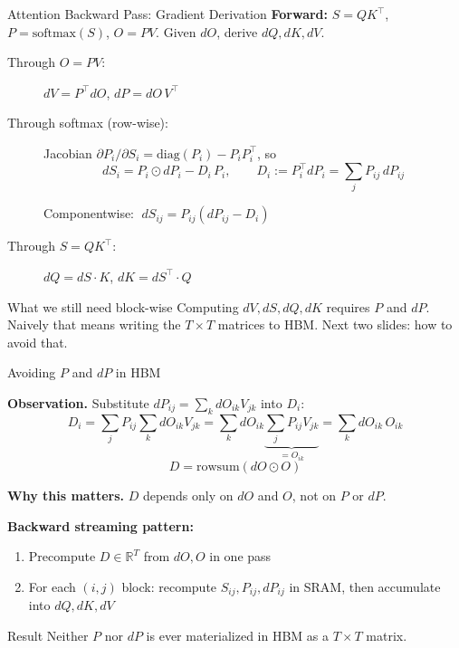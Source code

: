 \begin{frame}{Attention Backward Pass: Gradient Derivation}
  \textbf{Forward:} $S = QK^\top$, \; $P = \text{softmax}(S)$, \; $O = PV$. \;
  Given $dO$, derive $dQ, dK, dV$.

  \vspace{0.6em}
  \begin{description}
    \item[Through $O = PV$:] \quad $dV = P^\top dO$, \quad $dP = dO\, V^\top$
    \item[Through softmax (row-wise):] Jacobian $\partial P_i/\partial S_i = \text{diag}(P_i) - P_i P_i^\top$, so
      \vspace{-0.3em}
      \[
        dS_i = P_i \odot dP_i - D_i\, P_i,
        \qquad D_i := P_i^\top dP_i = \sum_j P_{ij}\, dP_{ij}
      \]
      \vspace{-1.0em}
      \begin{center}
        Componentwise: $\; dS_{ij} = P_{ij}(dP_{ij} - D_i)$
      \end{center}
    \item[Through $S = QK^\top$:] \quad $dQ = dS \cdot K$, \quad $dK = dS^\top \cdot Q$
  \end{description}

  \vspace{0.6em}
  \begin{alertblock}{What we still need block-wise}
    Computing $dV, dS, dQ, dK$ requires $P$ and $dP$. Naively that means writing the $T \times T$ matrices to HBM. Next two slides: how to avoid that.
  \end{alertblock}
\end{frame}

\begin{frame}{Avoiding $P$ and $dP$ in HBM}

  \textbf{Observation.} Substitute $dP_{ij} = \sum_k dO_{ik} V_{jk}$ into $D_i$:
  \vspace{-0.3em}
  \[
    D_i = \sum_j P_{ij} \sum_k dO_{ik} V_{jk}
        = \sum_k dO_{ik} \underbrace{\sum_j P_{ij} V_{jk}}_{= O_{ik}}
        = \sum_k dO_{ik}\, O_{ik}
  \]
  \vspace{-0.3em}
  \[
    \boxed{\; D = \text{rowsum}(dO \odot O) \;}
  \]

  \vspace{0.4em}
  \textbf{Why this matters.} $D$ depends only on $dO$ and $O$, not on $P$ or $dP$.

  \vspace{0.4em}
  \textbf{Backward streaming pattern:}
  \begin{enumerate}
    \item Precompute $D \in \mathbb{R}^{T}$ from $dO, O$ in one pass
    \item For each $(i,j)$ block: recompute $S_{ij}, P_{ij}, dP_{ij}$ in SRAM, then accumulate into $dQ, dK, dV$
  \end{enumerate}

  \vspace{0.4em}
  \begin{alertblock}{Result}
    Neither $P$ nor $dP$ is ever materialized in HBM as a $T \times T$ matrix.
  \end{alertblock}
\end{frame}

